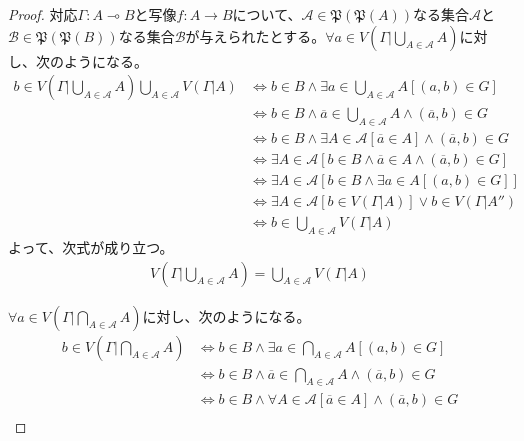 \documentclass[a4paper]{jsarticle}
\begin{document}
\begin{proof}
対応$\varGamma:A \multimap B$と写像$f:A \rightarrow B$について、$\mathcal{A}\in \mathfrak{P}\left( \mathfrak{P}(A) \right)$なる集合$\mathcal{A}$と$\mathcal{B}\in \mathfrak{P}\left( \mathfrak{P}(B) \right)$なる集合$\mathcal{B}$が与えられたとする。$\forall a \in V\left( \varGamma|\bigcup_{A \in \mathcal{A}} A \right)$に対し、次のようになる。
\begin{align*}
b \in V\left( \varGamma|\bigcup_{A \in \mathcal{A}} A \right)\bigcup_{A \in \mathcal{A}} {V\left( \varGamma|A \right)} &\Leftrightarrow b \in B \land \exists a \in \bigcup_{A \in \mathcal{A}} A\left[ (a,b) \in G \right]\\
&\Leftrightarrow b \in B \land \overline{a} \in \bigcup_{A \in \mathcal{A}} A \land \left( \overline{a},b \right) \in G\\
&\Leftrightarrow b \in B \land \exists A \in \mathcal{A}\left[ \overline{a} \in A \right] \land \left( \overline{a},b \right) \in G\\
&\Leftrightarrow \exists A \in \mathcal{A}\left[ b \in B \land \overline{a} \in A \land \left( \overline{a},b \right) \in G \right]\\
&\Leftrightarrow \exists A \in \mathcal{A}\left[ b \in B \land \exists a \in A\left[ (a,b) \in G \right] \right]\\
&\Leftrightarrow \exists A \in \mathcal{A}\left[ b \in V\left( \varGamma|A \right) \right] \vee b \in V\left( \varGamma|A'' \right)\\
&\Leftrightarrow b \in \bigcup_{A \in \mathcal{A}} {V\left( \varGamma|A \right)}
\end{align*}
よって、次式が成り立つ。
\begin{align*}
V\left( \varGamma|\bigcup_{A \in \mathcal{A}} A \right) = \bigcup_{A \in \mathcal{A}} {V\left( \varGamma|A \right)}
\end{align*}\par
$\forall a \in V\left( \varGamma|\bigcap_{A \in \mathcal{A}} A \right)$に対し、次のようになる。
\begin{align*}
b \in V\left( \varGamma|\bigcap_{A \in \mathcal{A}} A \right) &\Leftrightarrow b \in B \land \exists a \in \bigcap_{A \in \mathcal{A}} A\left[ (a,b) \in G \right]\\
&\Leftrightarrow b \in B \land \overline{a} \in \bigcap_{A \in \mathcal{A}} A \land \left( \overline{a},b \right) \in G\\
&\Leftrightarrow b \in B \land \forall A \in \mathcal{A}\left[ \overline{a} \in A \right] \land \left( \overline{a},b \right) \in G\\

\end{align*}
\end{proof}
\end{document}
